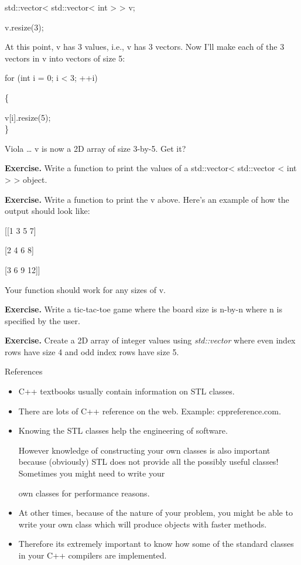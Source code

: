 \documentclass[
]{article}
\begin{document}
std::vector\textless{} std::vector\textless{} int \textgreater{}
\textgreater{} v;

v.resize(3);

At this point, v has 3 values, i.e., v has 3 vectors. Now I'll make each
of the 3 vectors in v into vectors of size 5:

for (int i = 0; i \textless{} 3; ++i)

\{

v{[}i{]}.resize(5);\\
\}

Viola \ldots{} v is now a 2D array of size 3-by-5. Get it?

\textbf{Exercise.} Write a function to print the values of a
std::vector\textless{} std::vector \textless{} int \textgreater{}
\textgreater{} object.

\textbf{Exercise.} Write a function to print the v above. Here's an
example of how the output should look like:

{[}{[}1 3 5 7{]}

{[}2 4 6 8{]}

{[}3 6 9 12{]}{]}

Your function should work for any sizes of v.

\textbf{Exercise.} Write a tic-tac-toe game where the board size is
n-by-n where n is specified by the user.

\textbf{\hfill\break
Exercise. }Create a 2D array of integer values using \emph{std::vector}
where even index rows have size 4 and odd index rows have size 5.

References

\begin{itemize}
\item
  C++ textbooks usually contain information on STL classes.
\item
  There are lots of C++ reference on the web. Example: cppreference.com.
\item
  Knowing the STL classes help the engineering of software.

  However knowledge of constructing your own classes is also important
  because (obviously) STL does not provide all the possibly useful
  classes! Sometimes you might need to write your

  own classes for performance reasons.
\item
  At other times, because of the nature of your problem, you might be
  able to write your own class which will produce objects with faster
  methods.
\item
  Therefore it\textquotesingle s extremely important to know how some of
  the standard classes in your C++ compilers are implemented.
\end{itemize}
\end{document}
